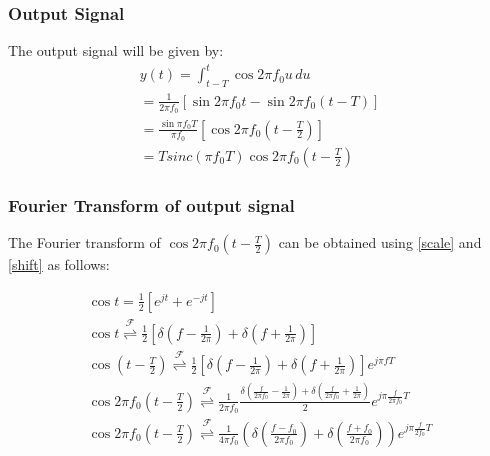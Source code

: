\documentclass{beamer}
\providecommand{\sbrak}[1]{\ensuremath{{}\left[#1\right]}}
\providecommand{\brak}[1]{\ensuremath{\left(#1\right)}}
\providecommand{\fourier}{\overset{\mathcal{F}}{ \rightleftharpoons}}
\begin{document}
\begin{frame}
    \frametitle{Output Signal}
    \begin{flushleft}
The output signal will be given by:
\begin{align}
    y(t) = \int_{t-T}^t \cos{2\pi f_0u}\,du\\
     = \frac{1}{2\pi f_0}\sbrak{\sin{2\pi f_0t}- \sin2\pi f_0({t-T})}\\
      = \frac{\sin\pi f_0 T}{\pi f_0} \sbrak{\cos2\pi f_0 \brak{t - \frac{T}{2}}}\\
      = Tsinc(\pi f_0 T)\cos2\pi f_0\brak{t - \frac{T}{2}}
      \label{output}
\end{align}
    \end{flushleft}
\end{frame}
\begin{frame}
    \frametitle{Fourier Transform of output signal}
    \begin{flushleft}
    The Fourier transform of $\cos2\pi f_0\brak{t - \frac{T}{2}}$ can be obtained using \eqref{scale} and \eqref{shift} as follows:

\begin{align}
    \cos t = \frac{1}{2}\sbrak{e^{jt} + e^{-jt}}\\
    \cos t \fourier \frac{1}{2}\sbrak{\delta\brak{f - \frac{1}{2\pi}} + \delta\brak{f + \frac{1}{2\pi}}}\\
    \cos\brak{t - \frac{T}{2}} \fourier \frac{1}{2}\sbrak{\delta\brak{f - \frac{1}{2\pi}} + \delta\brak{f + \frac{1}{2\pi}}} e^{j\pi fT}\\
    \cos2\pi f_0\brak{t - \frac{T}{2}} \fourier \frac{1}{2\pi f_0}\frac{\delta(\frac{f}{2\pi f_0} - \frac{1}{2\pi}) + \delta(\frac{f}{2\pi f_0} + \frac{1}{2\pi})}{2} e^{j\pi \frac{f}{2\pi f_0}T}\\
    \cos2\pi f_0\brak{t - \frac{T}{2}} \fourier\frac{1}{4\pi f_0}\brak{\delta\brak{\frac{f - f_0}{2\pi f_0}} + \delta\brak{\frac{f + f_0}{2\pi f_0}}}e^{j\pi \frac{f}{2f_0}T}
\end{align}

    \end{flushleft}
\end{frame}
\end{document}
